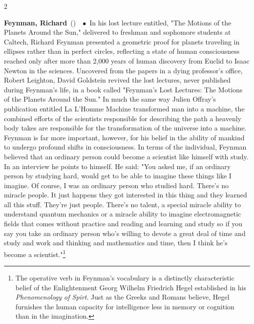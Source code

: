 \documentclass[10pt,a4paper,twoside]{article} %
\newcommand{\entry}[4]{\markboth{#1}{#1}\textbf{#1}\ {(#2)}\ \textit{#3}\ $\bullet$\ {#4}}  %
\begin{document}
\begin{multicols}{2}
\entry{Feynman, Richard} {} {} {In his lost lecture entitled, "The Motions of the Planets Around the Sun," delivered to freshman and sophomore students at Caltech, Richard Feynman presented a geometric proof for planets traveling in ellipses rather than in perfect circles, reflecting a state of human consciousness reached only after more than 2,000 years of human discovery from Euclid to Isaac Newton in the sciences. \newline \indent Uncovered from the papers in a dying professor's office, Robert Leighton, David Goldstein revived the lost lectures, never published during Feynman's life, in a book called "Feynman's Lost Lectures: The Motions of the Planets Around the Sun." \newline \indent In much the same way Julien Offray's publication entitled La L'Homme Machine transformed man into a machine, the combined efforts of the scientists responsible for describing the path a heavenly body takes are responsible for the transformation of the universe into a machine. \newline \indent Feynman is far more important, however, for his belief in the ability of mankind to undergo profound shifts in consciousness. In terms of the individual, Feynman believed that an ordinary person could become a scientist like himself with study. In an interview he points to himself. He said: "You asked me, if an ordinary person by studying hard, would get to be able to imagine these things like I imagine. Of course, I was an ordinary person who studied hard. There's no miracle people. It just happens they got interested in this thing and they learned all this stuff. They're just people. There's no talent, a special miracle ability to understand quantum mechanics or a miracle ability to imagine electromagnetic fields that comes without practice and reading and learning and study so if you say you take an ordinary person who's willing to devote a great deal of time and study and work and thinking and mathematics and time, then I think he's become a scientist."\footnote{The operative verb in Feynman's vocabulary is a distinctly characteristic belief of the Enlightenment Georg Wilhelm Friedrich Hegel established in his \emph{Phenomenology of Spirt}. Just as the Greeks and Romans believe, Hegel furnishes the human capacity for intelligence less in memory or cognition than in the imagination.} 
}



\end{multicols}
\end{document}
